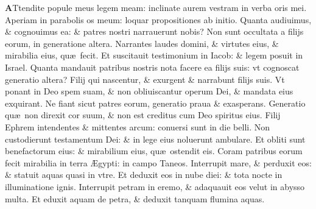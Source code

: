 \documentclass[a5paper,10pt]{book}
\def\ae{æ}
\def\AE{Æ}
\begin{document}
\begin{multicols*}{2}
\lettrine[lines=2]{\bfseries \color{red} A}{}Ttendite popule meus legem meam: inclinate aurem vestram in verba oris mei.
\newline \color{red} A\color{black}periam in parabolis os meum: loquar propositiones ab initio.
\newline \color{red} Q\color{black}uanta audiuimus, \& cognouimus ea: \& patres nostri narrauerunt nobis?
\newline \color{red} N\color{black}on sunt occultata a filijs eorum, in generatione altera.
\newline \color{red} N\color{black}arrantes laudes domini, \& virtutes eius, \& mirabilia eius, qu\ae \ fecit.
\newline \color{red} E\color{black}t suscitauit testimonium in Iacob: \& legem posuit in Israel.
\newline \color{red} Q\color{black}uanta mandauit patribus nostris nota facere ea filijs suis: vt cognoscat generatio altera?
\newline \color{red} F\color{black}ilij qui nascentur, \& exurgent \& narrabunt filijs suis.
\newline \color{red} V\color{black}t ponant in Deo spem suam, \& non obliuiscantur operum Dei, \& mandata eius exquirant.
\newline \color{red} N\color{black}e fiant sicut patres eorum, generatio praua \& exasperans.
\newline \color{red} G\color{black}eneratio qu\ae \ non direxit cor suum, \& non est creditus cum Deo spiritus eius.
\newline \color{red} F\color{black}ilij Ephrem intendentes \& mittentes arcum: conuersi sunt in die belli.
\newline \color{red} N\color{black}on custodierunt testamentum Dei: \& in lege eius noluerunt ambulare.
\newline \color{red} E\color{black}t obliti sunt benefactorum eius: \& mirabilium eius, qu\ae \ ostendit eis.
\newline \color{red} C\color{black}oram patribus eorum fecit mirabilia in terra \AE gypti: in campo Taneos.
\newline \color{red} I\color{black}nterrupit mare, \& perduxit eos: \& statuit aquas quasi in vtre.
\newline \color{red} E\color{black}t deduxit eos in nube diei: \& tota nocte in illuminatione ignis.
\newline \color{red} I\color{black}nterrupit petram in eremo, \& adaquauit eos velut in abysso multa.
\newline \color{red} E\color{black}t eduxit aquam de petra, \& deduxit tanquam flumina aquas.

\end{multicols*}
\end{document}
